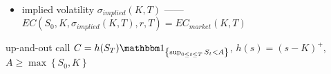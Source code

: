 \begin{itemize}
    \item implied volatility $\sigma_{implied}(K, T)$ ------ $EC(S_0, K, \sigma_{implied}(K, T), r, T) = EC_{market}(K, T)$
\end{itemize}

\begin{example}
    up-and-out call $C = h(S_T)\In_{\left\{ \sup_{0 \leq t \leq T} S_t<A \right\}}$, $h(s) = (s - K)^+$, $A \geq \max\left\{ S_0, K \right\}$
\end{example}